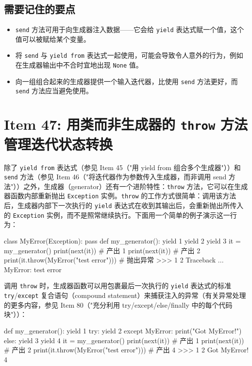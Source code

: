 \subsection{需要记住的要点}
\begin{itemize}
\item \texttt{send} 方法可用于向生成器注入数据——它会给 \texttt{yield} 表达式赋一个值，这个值可以被赋给某个变量。
\item 将 \texttt{send} 与 \texttt{yield from} 表达式一起使用，可能会导致令人意外的行为，例如在生成器输出中不合时宜地出现 \texttt{None} 值。
\item 向一组组合起来的生成器提供一个输入迭代器，比使用 \texttt{send} 方法更好，而 \texttt{send} 方法应当避免使用。
\end{itemize}

\section{Item 47: 用类而非生成器的 \texttt{throw} 方法管理迭代状态转换}

除了 \texttt{yield from} 表达式（参见 Item 45（"用 yield from 组合多个生成器"））和 \texttt{send} 方法（参见 Item 46（"将迭代器作为参数传入生成器，而非调用 send 方法"））之外，生成器（generator）还有一个进阶特性：\texttt{throw} 方法，它可以在生成器函数内部重新抛出 \texttt{Exception} 实例。\texttt{throw} 的工作方式很简单：调用该方法后，生成器内部下一次执行的 \texttt{yield} 表达式在收到其输出后，会重新抛出所传入的 \texttt{Exception} 实例，而不是照常继续执行。下面用一个简单的例子演示这一行为：

\begin{codebox}[python]
class MyError(Exception):
    pass
def my_generator():
    yield 1
    yield 2
    yield 3
it = my_generator()
print(next(it))                         # 产出 1
print(next(it))                         # 产出 2
print(it.throw(MyError("test error")))  # 抛出异常
>>>
1
2
Traceback ...
MyError: test error
\end{codebox}

调用 \texttt{throw} 时，生成器函数可以用包裹最后一次执行的 \texttt{yield} 表达式的标准 \texttt{try}/\texttt{except} 复合语句（compound statement）来捕获注入的异常（有关异常处理的更多内容，参见 Item 80（"充分利用 try/except/else/finally 中的每个代码块"））：

\begin{codebox}[python]
def my_generator():
    yield 1
    try:
        yield 2
    except MyError:
        print("Got MyError!")
    else:
        yield 3
    yield 4
it = my_generator()
print(next(it))                         # 产出 1
print(next(it))                         # 产出 2
print(it.throw(MyError("test error")))  # 产出 4
>>>
1
2
Got MyError!
4
\end{codebox}

